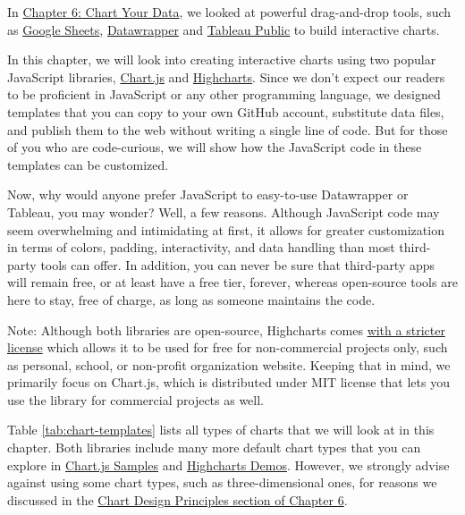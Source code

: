 \documentclass[
  english,
]{book}
\begin{document}
In \href{chart.html}{Chapter 6: Chart Your Data}, we looked at powerful drag-and-drop tools,
such as \href{chart-google.html}{Google Sheets}, \href{chart-datawrapper.html}{Datawrapper}
and \href{chart-tableau.html}{Tableau Public} to build interactive charts.

In this chapter, we will look into creating interactive charts using two popular
JavaScript libraries, \href{https://www.chartjs.org/}{Chart.js} and \href{https://www.highcharts.com/}{Highcharts}.
Since we don't expect our readers to be proficient in JavaScript or any
other programming language, we designed templates that you can copy
to your own GitHub account, substitute data files, and publish them to the web
without writing a single line of code. But for those of you who are code-curious,
we will show how the JavaScript code in these templates can be customized.

Now, why would anyone prefer JavaScript to easy-to-use Datawrapper or Tableau, you may wonder? Well, a few reasons. Although JavaScript code may seem overwhelming and intimidating at first, it allows for greater customization in terms of colors, padding, interactivity, and data handling than most third-party tools can offer. In addition, you can never be sure that third-party apps will remain free, or at least have a free tier, forever, whereas open-source tools are here to stay, free of charge, as long as someone maintains the code.

Note: Although both libraries are open-source, Highcharts comes \href{https://www.highcharts.com/products/highcharts/\#non-commercial}{with a stricter license} which allows it to be used for free for non-commercial projects only, such as personal, school, or non-profit organization website. Keeping that in mind, we primarily focus on Chart.js, which is distributed under MIT license that lets you use the library for commercial projects as well.

Table \ref{tab:chart-templates} lists all types of charts that we will look at in this chapter. Both libraries include many more default chart types that you can explore
in \href{https://www.chartjs.org/samples/latest/}{Chart.js Samples} and \href{https://www.highcharts.com/demo}{Highcharts Demos}. However, we strongly advise against using some chart types, such as three-dimensional ones, for reasons we discussed in the \href{chart-design}{Chart Design Principles section of Chapter 6}.
\end{document}
